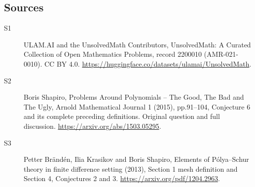 \documentclass[11pt]{article}
\begin{document}
\subsection{Sources}
\begin{description}
\item[\hypertarget{source:2200010:1}{S1}] ULAM.AI and the UnsolvedMath Contributors, UnsolvedMath: A Curated Collection of Open Mathematics Problems, record 2200010 (AMR-021-0010). CC BY 4.0. \url{https://huggingface.co/datasets/ulamai/UnsolvedMath}.
\item[\hypertarget{source:2200010:2}{S2}] Boris Shapiro, Problems Around Polynomials -- The Good, The Bad and The Ugly, Arnold Mathematical Journal 1 (2015), pp.91--104, Conjecture 6 and its complete preceding definitions. Original question and full discussion. \url{https://arxiv.org/abs/1503.05295}.
\item[\hypertarget{source:2200010:3}{S3}] Petter Brändén, Ilia Krasikov and Boris Shapiro, Elements of Pólya--Schur theory in finite difference setting (2013), Section 1 mesh definition and Section 4, Conjectures 2 and 3. \url{https://arxiv.org/pdf/1204.2963}.
\end{description}
\label{end:2200010}
\end{document}
